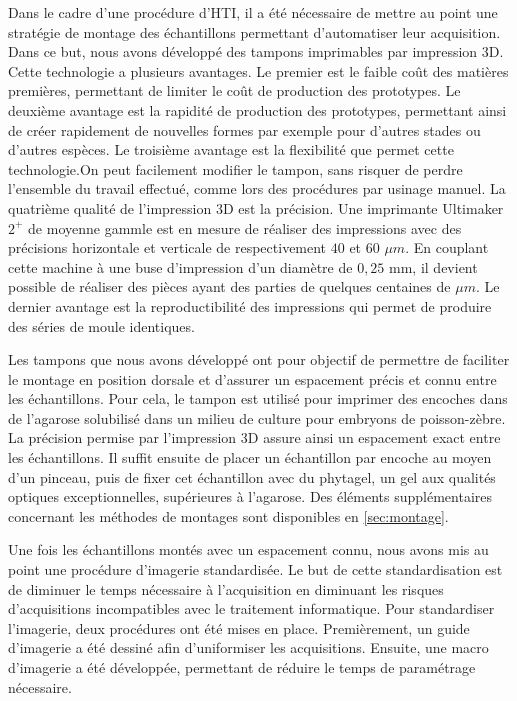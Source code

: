 \documentclass[\main/main.tex]{subfiles}
\begin{document}
%
Dans le cadre d'une procédure d'HTI, il a été nécessaire de mettre au point une stratégie de montage des échantillons permettant d'automatiser leur acquisition.
%
Dans ce but, nous avons développé des tampons imprimables par impression 3D.
%
Cette technologie a plusieurs avantages.
%
Le premier est le faible coût des matières premières, permettant de limiter le coût de production des prototypes.
%
Le deuxième avantage est la rapidité de production des prototypes, permettant ainsi de créer rapidement de nouvelles formes par exemple pour d'autres stades ou d'autres espèces.
%
Le troisième avantage est la flexibilité que permet cette technologie.On peut facilement modifier le tampon, sans risquer de perdre l'ensemble du travail effectué, comme lors des procédures par usinage manuel.
%
La quatrième qualité de l'impression 3D est la précision.
%
Une imprimante Ultimaker $2^+$ de moyenne gammle est en mesure de réaliser des 
impressions avec des précisions horizontale et verticale de respectivement $40$ et $60$ $\mu{}m$.
%
En couplant cette machine à une buse d'impression d'un diamètre de $0,25$ mm, il devient possible de réaliser des pièces ayant des parties de quelques centaines de $\mu{}m$.
%
Le dernier avantage est la reproductibilité  des impressions qui permet de produire des séries de moule identiques.

\label{chapter:bio:montage}
%
Les tampons que nous avons développé ont pour objectif de permettre
de faciliter le montage en position dorsale et d'assurer un espacement
précis et connu entre les échantillons.
%
Pour cela,
le tampon est utilisé pour imprimer des encoches dans de l'agarose solubilisé dans un milieu de culture pour embryons de poisson-zèbre.
%
La précision permise par l'impression 3D assure ainsi un espacement exact entre les échantillons.
%
Il suffit ensuite de placer un échantillon par encoche au moyen d'un pinceau,
puis de fixer cet échantillon avec du phytagel, un gel aux qualités optiques exceptionnelles, supérieures à l'agarose.
%
Des éléments supplémentaires concernant les méthodes de montages sont disponibles en \autoref{sec:montage}.

%
Une fois les échantillons montés avec un espacement connu,
nous avons mis au point une procédure d'imagerie standardisée.
%
Le but de cette standardisation est de diminuer le temps nécessaire à l'acquisition
en diminuant les risques d'acquisitions incompatibles avec le traitement informatique.
%
Pour standardiser l'imagerie, deux procédures ont été mises en place.
%
Premièrement, un guide d'imagerie a été dessiné afin d'uniformiser les acquisitions.
%
Ensuite, une macro d'imagerie a été développée, permettant de réduire le temps
de paramétrage nécessaire.
\end{document}
